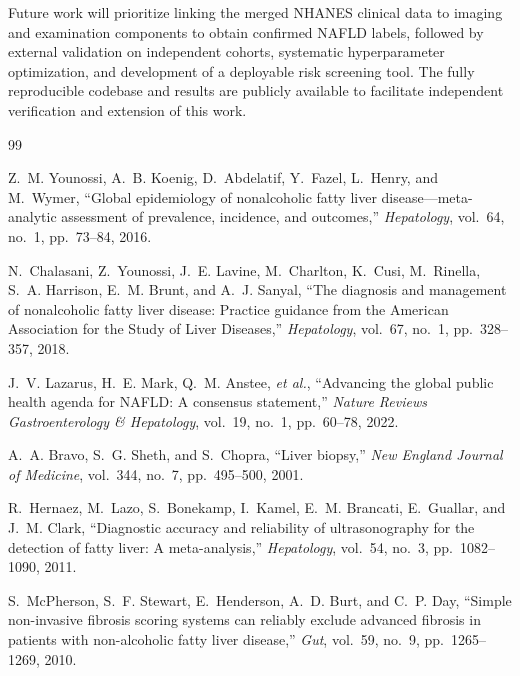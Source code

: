 \documentclass[conference,10pt]{IEEEtran}
\begin{document}
Future work will prioritize linking the merged NHANES clinical data to imaging and examination components to obtain confirmed NAFLD labels, followed by external validation on independent cohorts, systematic hyperparameter optimization, and development of a deployable risk screening tool. The fully reproducible codebase and results are publicly available to facilitate independent verification and extension of this work.


\begin{thebibliography}{99}

Z.~M. Younossi, A.~B. Koenig, D.~Abdelatif, Y.~Fazel, L.~Henry, and M.~Wymer,
``Global epidemiology of nonalcoholic fatty liver disease—meta-analytic assessment of prevalence, incidence, and outcomes,''
\textit{Hepatology}, vol.~64, no.~1, pp.~73--84, 2016.

N.~Chalasani, Z.~Younossi, J.~E. Lavine, M.~Charlton, K.~Cusi, M.~Rinella, S.~A. Harrison, E.~M. Brunt, and A.~J. Sanyal,
``The diagnosis and management of nonalcoholic fatty liver disease: Practice guidance from the American Association for the Study of Liver Diseases,''
\textit{Hepatology}, vol.~67, no.~1, pp.~328--357, 2018.

J.~V. Lazarus, H.~E. Mark, Q.~M. Anstee, \textit{et al.},
``Advancing the global public health agenda for NAFLD: A consensus statement,''
\textit{Nature Reviews Gastroenterology \& Hepatology}, vol.~19, no.~1, pp.~60--78, 2022.

A.~A. Bravo, S.~G. Sheth, and S.~Chopra,
``Liver biopsy,''
\textit{New England Journal of Medicine}, vol.~344, no.~7, pp.~495--500, 2001.

R.~Hernaez, M.~Lazo, S.~Bonekamp, I.~Kamel, E.~M. Brancati, E.~Guallar, and J.~M. Clark,
``Diagnostic accuracy and reliability of ultrasonography for the detection of fatty liver: A meta-analysis,''
\textit{Hepatology}, vol.~54, no.~3, pp.~1082--1090, 2011.

S.~McPherson, S.~F. Stewart, E.~Henderson, A.~D. Burt, and C.~P. Day,
``Simple non-invasive fibrosis scoring systems can reliably exclude advanced fibrosis in patients with non-alcoholic fatty liver disease,''
\textit{Gut}, vol.~59, no.~9, pp.~1265--1269, 2010.


\end{thebibliography}
\end{document}
